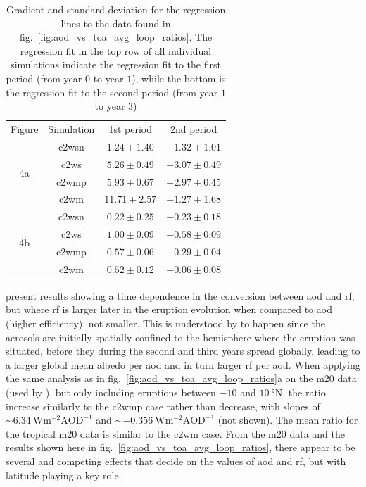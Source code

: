 \documentclass{ametsocV6.1}
\begin{document}
\begin{table}
  \centering

  \caption{Gradient and standard deviation for the regression lines to the data found in
    fig.~\ref{fig:aod_vs_toa_avg_loop_ratios}. The regression fit in the top row of all
    individual simulations indicate the regression fit to the first period (from year \(0\)
    to year \(1\)), while the bottom is the regression fit to the second period (from year
    \(1\) to year \(3\))}\label{tab:slope-gradients}%
  \begin{tabular}{cccc}
    Figure              & Simulation  & 1st period       & 2nd period       \\
    \multirow{4}{*}{4a} & \gls{c2wsn} & \(1.24\pm1.40\)  & \(-1.32\pm1.01\) \\
                        & \gls{c2ws}  & \(5.26\pm0.49\)  & \(-3.07\pm0.49\) \\
                        & \gls{c2wmp} & \(5.93\pm0.67\)  & \(-2.97\pm0.45\) \\
                        & \gls{c2wm}  & \(11.71\pm2.57\) & \(-1.27\pm1.68\) \\
    \multirow{4}{*}{4b} & \gls{c2wsn} & \(0.22\pm0.25\)  & \(-0.23\pm0.18\) \\
                        & \gls{c2ws}  & \(1.00\pm0.09\)  & \(-0.58\pm0.09\) \\
                        & \gls{c2wmp} & \(0.57\pm0.06\)  & \(-0.29\pm0.04\) \\
                        & \gls{c2wm}  & \(0.52\pm0.12\)  & \(-0.06\pm0.08\) \\
  \end{tabular}
\end{table}

\citet[][their Fig.\ 1c,d]{marshall2020} present results showing a time dependence in
the conversion between \gls{aod} and \gls{rf}, but where \gls{rf} is larger later in the
eruption evolution when compared to \gls{aod} (higher efficiency), not smaller. This is
understood by \citet{marshall2020} to happen since the aerosols are initially spatially
confined to the hemisphere where the eruption was situated, before they during the
second and third years spread globally, leading to a larger global mean albedo per
\gls{aod} and in turn larger \gls{rf} per \gls{aod}. When applying the same analysis as
in fig.~\ref{fig:aod_vs_toa_avg_loop_ratios}a on the \gls{m20} data (used by
\citet{marshall2020}), but only including eruptions between \(-10\) and
\(\SI{10}{\degree\mathrm{N}}\), the ratio increase similarly to the \gls{c2wmp} case
rather than decrease, with slopes of
\(\sim\SI{6.34}{\watt\metre^{-2}\mathrm{AOD}^{-1}}\) and
\(\sim\SI{-0.356}{\watt\metre^{-2}\mathrm{AOD}^{-1}}\) (not shown). The mean ratio for
the tropical \gls{m20} data is similar to the \gls{c2wm} case. From the \gls{m20} data
and the results shown here in fig.~\ref{fig:aod_vs_toa_avg_loop_ratios}, there appear to
be several and competing effects that decide on the values of \gls{aod} and \gls{rf},
but with latitude playing a key role.
\end{document}
